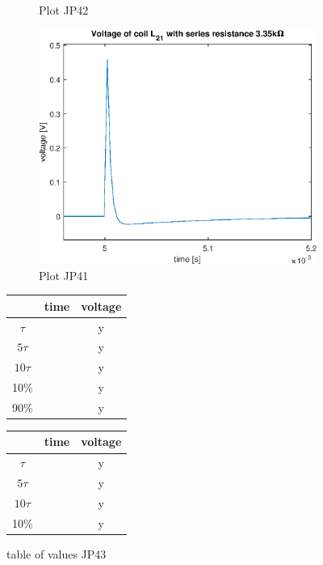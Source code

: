 \documentclass[notitlepage, a4paper, 11pt]{article}
\begin{document}
\begin{figure}[H]
\begin{subfigure}{0.3 \textwidth}
			\caption{Plot JP42}
		\end{subfigure}
		\hfill
		\begin{subfigure}{0.3 \textwidth}
			\includegraphics[width=\textwidth]{../Matlab/img/CircuitC1}
			\caption{Plot JP41}
		\end{subfigure}
		\begin{subtable}{0.3\textwidth}
		\centering
		\begin{tabular}{|c|c|c|}
			\hline
			& time & voltage \\
			\hline
			$\tau$ & & y \\
			\hline		
			$5\tau$ & & y \\
			\hline
			$10\tau$ & & y \\
			\hline
			10\% & & y \\
			\hline
			90\% & & y \\
			\hline
		\end{tabular}
		\caption{table of values JP43}
		\end{subtable}
		\hfill
		\begin{subtable}{0.3\textwidth}
			\centering
			\begin{tabular}{|c|c|c|}
				\hline
				& time & voltage \\
				\hline
				$\tau$ & & y \\
				\hline		
				$5\tau$ & & y \\
				\hline
				$10\tau$ & & y \\
				\hline
				10\% & & y \\

\end{tabular}
\end{subtable}
\end{figure}
\end{document}
